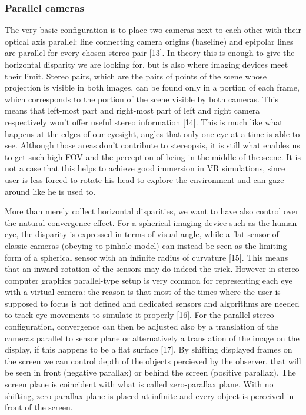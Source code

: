 \subsubsection{Parallel cameras}
The very basic configuration is to place two cameras next to each other with their optical axis parallel: line connecting camera origins (baseline) and epipolar lines are parallel for every chosen stereo pair [13]. In theory this is enough to give the horizontal disparity we are looking for, but is also where imaging devices meet their limit. Stereo pairs, which are the pairs of points of the scene whose projection is visible in both images, can be found only in a portion of each frame, which corresponds to the portion of the scene visible by both cameras. This means that left-most part and right-most part of left and right camera respectively won't offer useful stereo information [14]. This is much like what happens at the edges of our eyesight, angles that only one eye at a time is able to see. Although those areas don't contribute to stereopsis, it is still what enables us to get such high FOV and the perception of being in the middle of the scene. It is not a case that this helps to achieve good immersion in VR simulations, since user is less forced to rotate his head to explore the environment and can gaze around like he is used to.

More than merely collect horizontal disparities, we want to have also control over the natural convergence effect. For a spherical imaging device such as the human eye, the disparity is expressed in terms of visual angle, while a flat sensor of classic cameras (obeying to pinhole model) can instead be seen as the limiting form of a spherical sensor with an infinite radius of curvature [15]. This means that an inward rotation of the sensors may do indeed the trick. However in stereo computer graphics parallel-type setup is very common for representing each eye with a virtual camera: the reason is that most of the times where the user is supposed to focus is not defined and dedicated sensors and algorithms are needed to track eye movements to simulate it properly [16]. For the parallel stereo configuration, convergence can then be adjusted also by a translation of the cameras parallel to sensor plane or alternatively a translation of the image on the display, if this happens to be a flat surface [17]. By shifting displayed frames on the screen we can control depth of the objects percieved by the observer, that will be seen in front (negative parallax) or behind the screen (positive parallax). The screen plane is coincident with what is called zero-parallax plane. With no shifting, zero-parallax plane is placed at infinite and every object is perceived in front of the screen.

